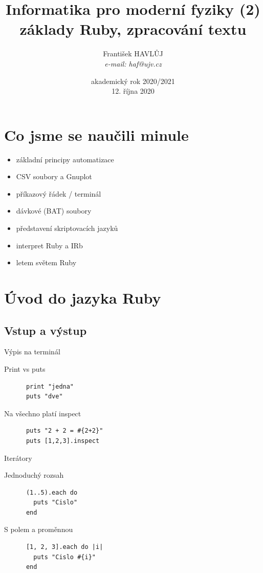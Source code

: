 \documentclass{beamer}
\title[IMF (2)]{Informatika pro moderní fyziky (2)\\základy Ruby, zpracování textu}
\author[Franti\v{s}ek HAVL\r{U}J, ORF ÚJV Řež]{Franti\v{s}ek HAVL\r{U}J\\{\scriptsize \emph{e-mail: haf@ujv.cz}}}
\date{akademický rok 2020/2021\\12. října 2020}
\institute[ORF ÚJV Řež]
{ÚJV Řež\\oddělení Reaktorové fyziky a podpory palivového cyklu}
\begin{document}
\begin{frame}
  \titlepage
\end{frame}

\begin{frame}
  \tableofcontents
\end{frame}

\section{Co jsme se naučili minule}

\begin{frame}{}
  \begin{itemize}
    \item základní principy automatizace
    \item CSV soubory a Gnuplot
    \item příkazový řádek / terminál
    \item dávkové (BAT) soubory
    \item představení skriptovacích jazyků
    \item interpret Ruby a IRb
    \item letem světem Ruby
  \end{itemize}
\end{frame}


\section{Úvod do jazyka Ruby}

\subsection{Vstup a výstup}

\begin{frame}[fragile]{Výpis na terminál}
  \begin{block}{Print vs puts}
    \begin{verbatim}
      print "jedna"
      puts "dve"
    \end{verbatim}
  \end{block}
  \pause
  \begin{block}{Na všechno platí inspect}
    \begin{verbatim}
      puts "2 + 2 = #{2+2}"
      puts [1,2,3].inspect
    \end{verbatim}
  \end{block}
\end{frame}

\begin{frame}[fragile]{Iterátory}
  \begin{block}{Jednoduchý rozsah}
    \begin{verbatim}
      (1..5).each do
        puts "Cislo"
      end
    \end{verbatim}
  \end{block}
  \pause
  \begin{block}{S polem a proměnnou}
    \begin{verbatim}
      [1, 2, 3].each do |i|
        puts "Cislo #{i}"
      end
    \end{verbatim}
  \end{block}
\end{frame}
\end{document}
